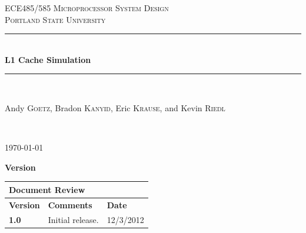 \documentclass{article}
\newcommand{\HRule}{\rule{\linewidth}{0.5mm}}
\begin{document}
\newenvironment{frcseries}{\fontfamily{frc}\selectfont}{}
\newcommand{\textfrc}[1]{{\frcseries#1}}
\newcommand{\mathfrc}[1]{\text{\textfrc{#1}}}


\begin{titlepage}
 
\begin{center}
 
 
\textsc{\LARGE ECE485/585 Microprocessor System Design}\\[1.5cm]
 
\textsc{\Large Portland State University}\\[0.5cm]
 
 
\HRule \\[0.4cm]
{ \huge \bfseries L1 Cache Simulation}\\[0.4cm]
 
\HRule \\[1.5cm]
 
\begin{minipage}{0.4\textwidth}
\begin{center} \large
Andy \textsc{Goetz}, Bradon \textsc{Kanyid}, Eric \textsc{Krause}, and Kevin \textsc{Riedl}\\
\end{center}
\end{minipage}

 

 
 
\end{center}
\vfill
{ \textit{} }\\[4.0cm]
\begin{center}
{\large \today}

\end{center} 
\end{titlepage}

\newpage

\textbf{\large Version}
\vspace{.1in}

\begin{tabular}{|p{1in}|p{4in}|p{1in}|}
\hline
\multicolumn{3}{|l|}{\textbf{Document Review}} \\ 
\hline
\textbf{Version}& \textbf{Comments} & \textbf{Date} \\ 
\hline
\textbf{1.0} & Initial release. & 12/3/2012 \\
\hline
\end{tabular}
\end{document}
